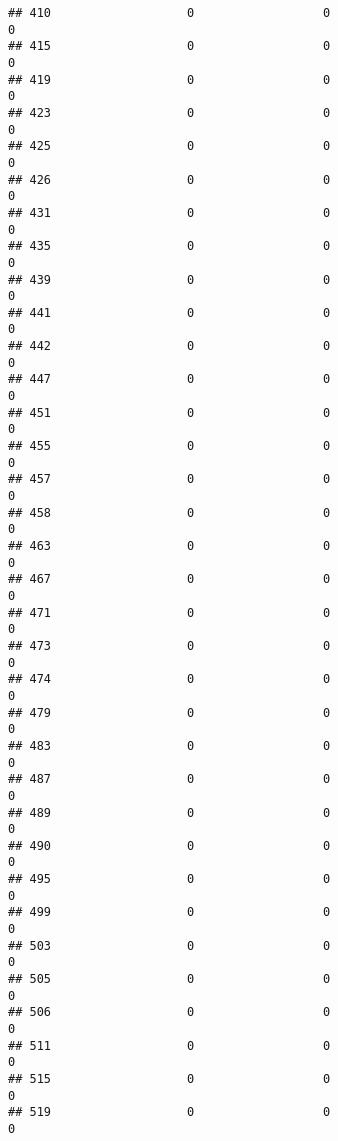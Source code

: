 \documentclass[
]{article}
\begin{document}
\begin{verbatim}
## 410                   0                  0                              0
## 415                   0                  0                              0
## 419                   0                  0                              0
## 423                   0                  0                              0
## 425                   0                  0                              0
## 426                   0                  0                              0
## 431                   0                  0                              0
## 435                   0                  0                              0
## 439                   0                  0                              0
## 441                   0                  0                              0
## 442                   0                  0                              0
## 447                   0                  0                              0
## 451                   0                  0                              0
## 455                   0                  0                              0
## 457                   0                  0                              0
## 458                   0                  0                              0
## 463                   0                  0                              0
## 467                   0                  0                              0
## 471                   0                  0                              0
## 473                   0                  0                              0
## 474                   0                  0                              0
## 479                   0                  0                              0
## 483                   0                  0                              0
## 487                   0                  0                              0
## 489                   0                  0                              0
## 490                   0                  0                              0
## 495                   0                  0                              0
## 499                   0                  0                              0
## 503                   0                  0                              0
## 505                   0                  0                              0
## 506                   0                  0                              0
## 511                   0                  0                              0
## 515                   0                  0                              0
## 519                   0                  0                              0

\end{verbatim}
\end{document}
